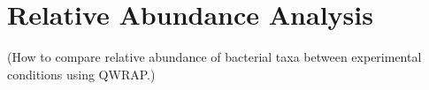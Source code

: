 \chapter{Relative Abundance Analysis}
(How to compare relative abundance of bacterial taxa between experimental conditions using QWRAP.)
